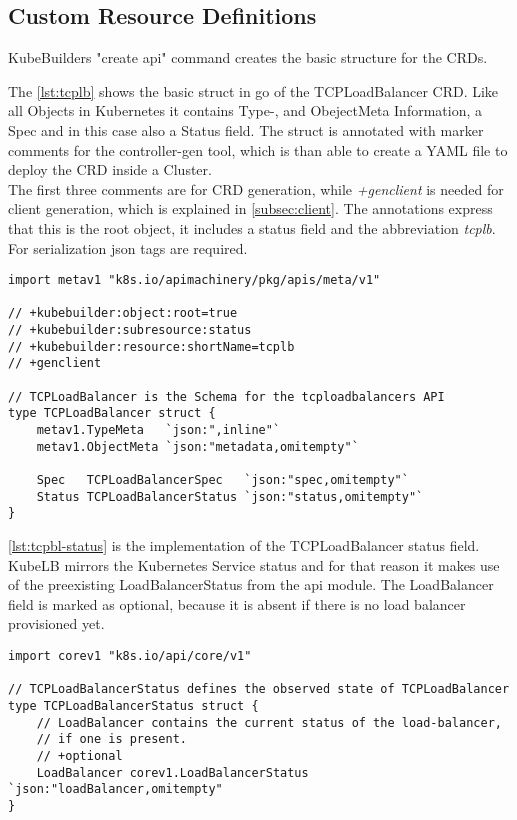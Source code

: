 \subsection{Custom Resource Definitions}

KubeBuilders "create api" command creates the basic structure for the CRDs.

The \autoref{lst:tcplb} shows the basic struct in go of the TCPLoadBalancer CRD.
Like all Objects in Kubernetes it contains Type-, and ObejectMeta Information, a Spec and in this case also a Status field.
The struct is annotated with marker comments for the controller-gen tool, which is than able to create a YAML file to deploy the CRD inside a Cluster.
\\
The first three comments are for CRD generation, while \textit{+genclient} is needed for client generation, which is explained in \autoref{subsec:client}.
The annotations express that this is the root object, it includes a status field and the abbreviation \textit{tcplb}.
For serialization json tags are required.

\begin{lstlisting}[caption={TCPLoadBalancer CRD root struct},label={lst:tcplb}]
import metav1 "k8s.io/apimachinery/pkg/apis/meta/v1"

// +kubebuilder:object:root=true
// +kubebuilder:subresource:status
// +kubebuilder:resource:shortName=tcplb
// +genclient

// TCPLoadBalancer is the Schema for the tcploadbalancers API
type TCPLoadBalancer struct {
	metav1.TypeMeta   `json:",inline"`
	metav1.ObjectMeta `json:"metadata,omitempty"`

	Spec   TCPLoadBalancerSpec   `json:"spec,omitempty"`
	Status TCPLoadBalancerStatus `json:"status,omitempty"`
}
\end{lstlisting}

\autoref{lst:tcpbl-status} is the implementation of the TCPLoadBalancer status field.
KubeLB mirrors the Kubernetes Service status and for that reason it makes use of the preexisting LoadBalancerStatus from the api module.
The LoadBalancer field is marked as optional, because it is absent if there is no load balancer provisioned yet.

\begin{lstlisting}[caption={TCPLoadBalancerStatus struct}, label={lst:tcpbl-status}]
import corev1 "k8s.io/api/core/v1"

// TCPLoadBalancerStatus defines the observed state of TCPLoadBalancer
type TCPLoadBalancerStatus struct {
	// LoadBalancer contains the current status of the load-balancer,
	// if one is present.
	// +optional
	LoadBalancer corev1.LoadBalancerStatus `json:"loadBalancer,omitempty"
}
\end{lstlisting}


